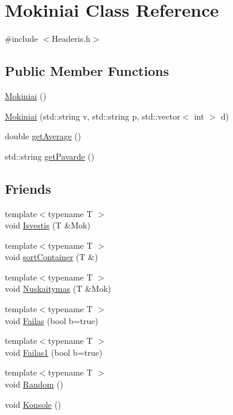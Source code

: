 \hypertarget{class_mokiniai}{}\section{Mokiniai Class Reference}
\label{class_mokiniai}


{\ttfamily \#include $<$Headeris.\+h$>$}

\subsection*{Public Member Functions}
\begin{DoxyCompactItemize}
\item 
\mbox{\hyperlink{class_mokiniai_a3d178ed1b403c8c2c016cad13fee7831}{Mokiniai}} ()
\item 
\mbox{\hyperlink{class_mokiniai_afe96df1e40d31c353e229ec69b56063a}{Mokiniai}} (std\+::string v, std\+::string p, std\+::vector$<$ int $>$ d)
\item 
double \mbox{\hyperlink{class_mokiniai_a4fbaa66eb59819ec942e2443a69fed4b}{get\+Average}} ()
\item 
std\+::string \mbox{\hyperlink{class_mokiniai_a50c74d525d0b2e381b1a7013d1d350e4}{get\+Pavarde}} ()
\end{DoxyCompactItemize}
\subsection*{Friends}
\begin{DoxyCompactItemize}
\item 
{\footnotesize template$<$typename T $>$ }\\void \mbox{\hyperlink{class_mokiniai_a8b31ae385d70b2d8716b6a1655a1b606}{Isvestis}} (T \&Mok)
\item 
{\footnotesize template$<$typename T $>$ }\\void \mbox{\hyperlink{class_mokiniai_a094a3acbb560126e8bb80b657d0e2a1b}{sort\+Container}} (T \&)
\item 
{\footnotesize template$<$typename T $>$ }\\void \mbox{\hyperlink{class_mokiniai_a67edc7d9369cb2287c4f2de53be0d7e1}{Nuskaitymas}} (T \&Mok)
\item 
{\footnotesize template$<$typename T $>$ }\\void \mbox{\hyperlink{class_mokiniai_af9a93fbf8962c85921db2e34cdb12b74}{Failas}} (bool b=true)
\item 
{\footnotesize template$<$typename T $>$ }\\void \mbox{\hyperlink{class_mokiniai_afdc65dddf430f261a0221df422c76be4}{Failas1}} (bool b=true)
\item 
{\footnotesize template$<$typename T $>$ }\\void \mbox{\hyperlink{class_mokiniai_ab5990b7e39e0e6a78a80a20caa87e33d}{Random}} ()
\item 
void \mbox{\hyperlink{class_mokiniai_a48b19837646f9c78fb3627c49f43fafb}{Konsole}} ()
\end{DoxyCompactItemize}


